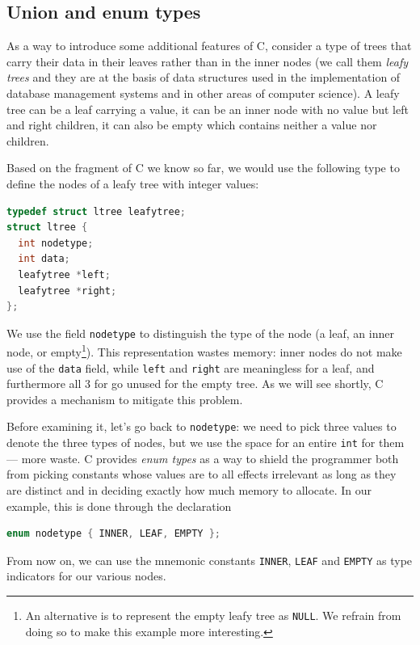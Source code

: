 \subsection{Union and enum types}
\label{sec:types:enum_union}

As a way to introduce some additional features of C, consider a type
of trees that carry their data in their leaves rather than in the
inner nodes (we call them \emph{leafy trees} and they are at the basis
of data structures used in the implementation of database management
systems and in other areas of computer science).  A leafy tree can be
a leaf carrying a value, it can be an inner node with no value but
left and right children, it can also be empty which contains neither a
value nor children.

Based on the fragment of C we know so far, we would use the following
type to define the nodes of a leafy tree with integer values:
\begin{lstlisting}[language=c]
typedef struct ltree leafytree;
struct ltree {
  int nodetype;
  int data;
  leafytree *left;
  leafytree *right;
};
\end{lstlisting}
We use the field \lstinline'nodetype' to distinguish the type of the
node (a leaf, an inner node, or empty\footnote{An alternative is to
  represent the empty leafy tree as \lstinline'NULL'.  We refrain from
  doing so to make this example more interesting.}).  This
representation wastes memory: inner nodes do not make use of the
\lstinline'data' field, while \lstinline'left' and \lstinline'right'
are meaningless for a leaf, and furthermore all 3 for go unused for
the empty tree.  As we will see shortly, C provides a mechanism to
mitigate this problem.

Before examining it, let's go back to \lstinline'nodetype': we need to
pick three values to denote the three types of nodes, but we use the
space for an entire \lstinline'int' for them --- more waste.  C
provides \emph{enum types} as a way to shield the programmer both from
picking constants whose values are to all effects irrelevant as long as
they are distinct and in deciding exactly how much memory to allocate.
In our example, this is done through the declaration
\begin{lstlisting}[language=c]
enum nodetype { INNER, LEAF, EMPTY };
\end{lstlisting}
From now on, we can use the mnemonic constants \lstinline'INNER',
\lstinline'LEAF' and \lstinline'EMPTY' as type indicators for our
various nodes.

